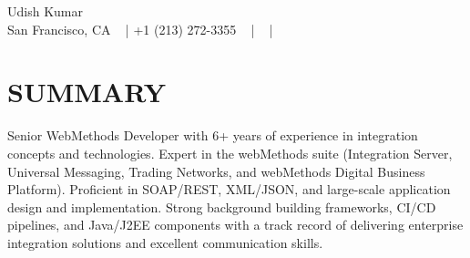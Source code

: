 \documentclass[letterpaper,11pt]{article}
\begin{document}

\begin{center}
    {\huge Udish Kumar} \\ \vspace{2pt} 
    {San Francisco, CA} ~ 
    \small{|}
    {+1 (213) 272-3355} ~ 
    \small{|}
    \href{mailto:udishkum@usc.edu}{\color{blue}{udishkum@usc.edu}} ~ 
    \small{|}
    \href{https://linkedin.com/in/iudishkumar}{\color{blue}{linkedin.com/in/iudishkumar}} ~
    \vspace{-7pt}
\end{center}

\section{\color{airforceblue}SUMMARY}
\justifying
\normalsize{Senior WebMethods Developer with 6+ years of experience in integration concepts and technologies. Expert in the webMethods suite (Integration Server, Universal Messaging, Trading Networks, and webMethods Digital Business Platform). Proficient in SOAP/REST, XML/JSON, and large-scale application design and implementation. Strong background building frameworks, CI/CD pipelines, and Java/J2EE components with a track record of delivering enterprise integration solutions and excellent communication skills.}
\raggedright
\vspace{-10pt}

\end{document}
